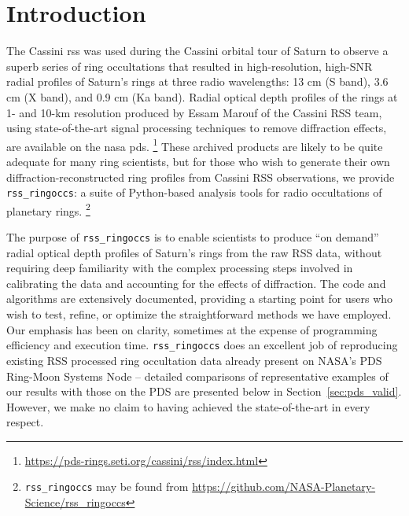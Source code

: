 \documentclass[titlepage, 12pt]{article}
\begin{document}
    \section{Introduction}
        The Cassini \gls{rss} was used during the Cassini
        orbital tour of Saturn to observe a superb series
        of ring occultations that resulted in high-resolution,
        high-SNR radial profiles of Saturn's rings at three
        radio wavelengths: 13 cm (S band), 3.6 cm (X band),
        and 0.9 cm (Ka band). Radial optical depth profiles of
        the rings at 1- and 10-km resolution produced by
        Essam Marouf of the Cassini RSS team,
        using state-of-the-art signal processing techniques
        to remove diffraction effects, are available on the
        \gls{nasa} \gls{pds}.%
        \footnote{\url{https://pds-rings.seti.org/cassini/rss/index.html}}
        These archived products are likely to be quite adequate
        for many ring scientists, but for those who wish
        to generate their own diffraction-reconstructed ring
        profiles from Cassini RSS observations, we provide
        \texttt{rss\_ringoccs}: a suite of Python-based analysis
        tools for radio occultations of planetary rings.%
        \footnote{%
            \texttt{rss\_ringoccs} may be found from
            \url{https://github.com/NASA-Planetary-Science/rss\_ringoccs}
        }
        \par\hfill\par
        The purpose of \texttt{rss\_ringoccs} is to enable
        scientists to produce ``on demand'' radial optical
        depth profiles of Saturn's rings from the raw RSS data,
        without requiring deep familiarity
        with the complex processing steps involved in calibrating
        the data and accounting for the effects of diffraction.
        The code and algorithms are extensively documented,
        providing a starting point
        for users who wish to test, refine, or optimize the
        straightforward methods we have employed.
        Our emphasis has been on clarity, sometimes at the
        expense of programming efficiency and execution time.
        \texttt{rss\_ringoccs} does an excellent job
        of reproducing existing RSS processed ring occultation
        data already present on NASA's PDS Ring-Moon Systems
        Node -- detailed comparisons of representative examples of
        our results with those on the PDS are presented below in
        Section~\ref{sec:pds_valid}.
        However, we make no claim to having achieved the
        state-of-the-art in every respect. 
\end{document}
